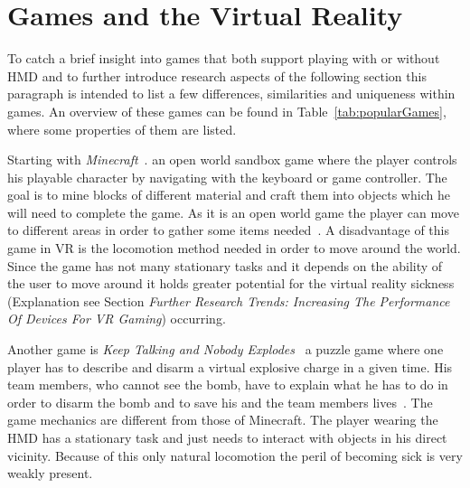 \section{Games and the Virtual Reality}
\label{sec:gamesNvr}

To catch a brief insight into games that both support playing with or without HMD and to further introduce research aspects of the following section this paragraph is intended to list a few differences, similarities and uniqueness within games. An overview of these games can be found in Table~\ref{tab:popularGames}, where some properties of them are listed. 

Starting with \textit{Minecraft}~\cite{game:minecraft}. an open world sandbox game where the player controls his playable character by navigating with the keyboard or game controller. The goal is to mine blocks of different material and craft them into objects which he will need to complete the game. As it is an open world game the player can move to different areas in order to gather some items needed~\cite{game:minecraft}. \newline
A disadvantage of this game in VR is the locomotion method needed in order to move around the world. Since the game has not many stationary tasks and it depends on the ability of the user to move around it holds greater potential for the virtual reality sickness (Explanation see Section \textit{Further Research Trends: Increasing The Performance Of Devices For VR Gaming}) occurring.

Another game is \textit{Keep Talking and Nobody Explodes}~\cite{game:keepTalking} a puzzle game where one player has to describe and disarm a virtual explosive charge in a given time. His team members, who cannot see the bomb, have to explain what he has to do in order to disarm the bomb and to save his and the team members lives~\cite{game:keepTalking}. The game mechanics are different from those of Minecraft. The player wearing the HMD has a stationary task and just needs to interact with objects in his direct vicinity. \newline
Because of this only natural locomotion the peril of becoming sick is very weakly present.

